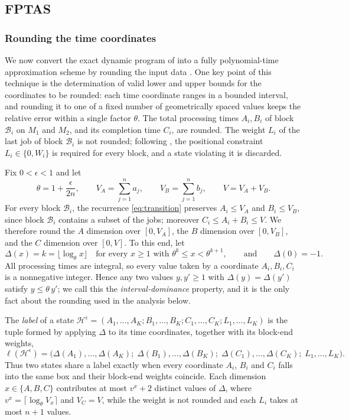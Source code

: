 \documentclass[12pt]{article}
\let\origsubsection\subsection
\renewcommand{\subsection}{\FloatBarrier\origsubsection}
\begin{document}
\begin{sloppypar}
\subsection{FPTAS}
\label{sub:fptas}

\subsubsection{Rounding the time coordinates}
\label{subsub:fptas-time}

We now convert the exact dynamic program of  into a fully
polynomial-time approximation scheme by rounding the input data
\citep{hall1994}. One key point of this technique is the determination of
valid lower and upper bounds for the coordinates to be rounded: each time
coordinate ranges in a bounded interval, and rounding it to one of a fixed number
of geometrically spaced values keeps the relative error within a single factor
$\theta$. The total processing times $A_i,B_i$ of block $\mathcal{B}_i$ on $M_1$
and $M_2$, and its completion time $C_i$, are rounded. The weight $L_i$ of the
last job of block $\mathcal{B}_i$ is not rounded; following
, the positional constraint $L_i\in\{0,W_i\}$ is required
for every block, and a state violating it is discarded.

Fix $0<\epsilon<1$ and let
\[
\theta=1+\frac{\epsilon}{2n},\qquad
V_A=\sum_{j=1}^{n}a_j,\qquad
V_B=\sum_{j=1}^{n}b_j,\qquad
V=V_A+V_B.
\]
For every block $\mathcal{B}_i$, the recurrence \cref{eq:transition}
preserves $A_i\le V_A$ and $B_i\le V_B$, since block $\mathcal{B}_i$ contains a
subset of the jobs; moreover $C_i\le A_i+B_i\le V$. We therefore round the $A$
dimension over $[0,V_A]$, the $B$ dimension over $[0,V_B]$, and the $C$
dimension over $[0,V]$. To this end, let
\[
\Delta(x)=k=\big\lfloor\log_\theta x\big\rfloor
\quad\text{for every }x\ge 1\text{ with }\theta^{k}\le x<\theta^{k+1},
\qquad\text{and}\qquad \Delta(0)=-1 .
\]
All processing times are integral, so every value taken by a coordinate
$A_i,B_i,C_i$ is a nonnegative integer. Hence any two values $y,y'\ge1$ with
$\Delta(y)=\Delta(y')$ satisfy $y\le\theta\,y'$; we call this the
\emph{interval-dominance} property, and it is the only fact about the rounding
used in the analysis below.

The \emph{label} of a
state $\mathscr{H}^{\epsilon}=(A_1,\dots,A_K; B_1,\dots,B_K; C_1,\dots,C_K; L_1,\dots,L_K)$
is the tuple formed by applying $\Delta$ to its time coordinates, together with its block-end weights,
\[
\ell(\mathscr{H}^{\epsilon})=
\bigl(\Delta(A_1),\dots,\Delta(A_K);\;
\Delta(B_1),\dots,\Delta(B_K);\;
\Delta(C_1),\dots,\Delta(C_K);\;
L_1,\dots,L_K\bigr).
\]
Thus two states share a label exactly when every coordinate $A_i$, $B_i$ and
$C_i$ falls into the same box and their block-end weights coincide. Each dimension
$x\in\{A,B,C\}$ contributes at
most $v^{x}+2$ distinct values of $\Delta$, where
$v^{x}=\lceil\log_\theta V_x\rceil$ and $V_C=V$, while the weight is not rounded and
each $L_i$ takes at most $n+1$ values.


\end{sloppypar}
\end{document}
